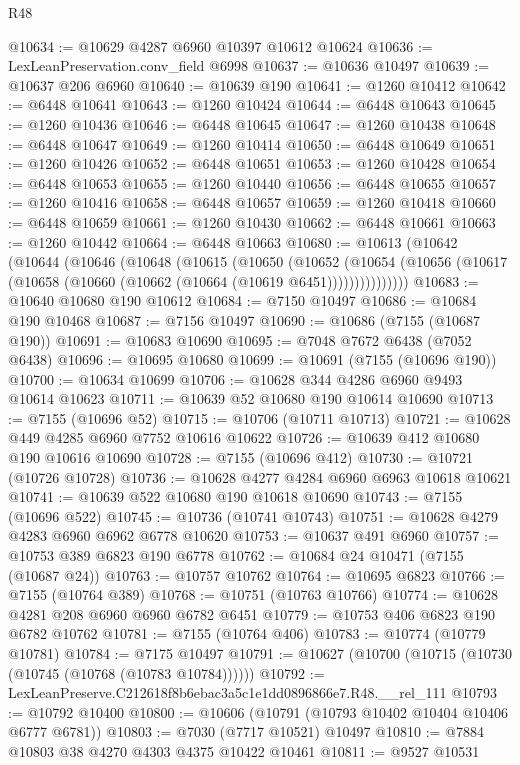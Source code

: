 \begin{lexlean}{R48}
\begin{coremodule}
@10634 := @10629 @4287 @6960 @10397 @10612 @10624
@10636 := LexLeanPreservation.conv_field @6998
@10637 := @10636 @10497
@10639 := @10637 @206 @6960
@10640 := @10639 @190
@10641 := @1260 @10412
@10642 := @6448 @10641
@10643 := @1260 @10424
@10644 := @6448 @10643
@10645 := @1260 @10436
@10646 := @6448 @10645
@10647 := @1260 @10438
@10648 := @6448 @10647
@10649 := @1260 @10414
@10650 := @6448 @10649
@10651 := @1260 @10426
@10652 := @6448 @10651
@10653 := @1260 @10428
@10654 := @6448 @10653
@10655 := @1260 @10440
@10656 := @6448 @10655
@10657 := @1260 @10416
@10658 := @6448 @10657
@10659 := @1260 @10418
@10660 := @6448 @10659
@10661 := @1260 @10430
@10662 := @6448 @10661
@10663 := @1260 @10442
@10664 := @6448 @10663
@10680 := @10613
    (@10642
      (@10644
        (@10646
          (@10648
            (@10615
              (@10650
                (@10652
                  (@10654
                    (@10656 (@10617 (@10658 (@10660 (@10662 (@10664 (@10619 @6451)))))))))))))))
@10683 := @10640 @10680 @190 @10612
@10684 := @7150 @10497
@10686 := @10684 @190 @10468
@10687 := @7156 @10497
@10690 := @10686 (@7155 (@10687 @190))
@10691 := @10683 @10690
@10695 := @7048 @7672 @6438 (@7052 @6438)
@10696 := @10695 @10680
@10699 := @10691 (@7155 (@10696 @190))
@10700 := @10634 @10699
@10706 := @10628 @344 @4286 @6960 @9493 @10614 @10623
@10711 := @10639 @52 @10680 @190 @10614 @10690
@10713 := @7155 (@10696 @52)
@10715 := @10706 (@10711 @10713)
@10721 := @10628 @449 @4285 @6960 @7752 @10616 @10622
@10726 := @10639 @412 @10680 @190 @10616 @10690
@10728 := @7155 (@10696 @412)
@10730 := @10721 (@10726 @10728)
@10736 := @10628 @4277 @4284 @6960 @6963 @10618 @10621
@10741 := @10639 @522 @10680 @190 @10618 @10690
@10743 := @7155 (@10696 @522)
@10745 := @10736 (@10741 @10743)
@10751 := @10628 @4279 @4283 @6960 @6962 @6778 @10620
@10753 := @10637 @491 @6960
@10757 := @10753 @389 @6823 @190 @6778
@10762 := @10684 @24 @10471 (@7155 (@10687 @24))
@10763 := @10757 @10762
@10764 := @10695 @6823
@10766 := @7155 (@10764 @389)
@10768 := @10751 (@10763 @10766)
@10774 := @10628 @4281 @208 @6960 @6960 @6782 @6451
@10779 := @10753 @406 @6823 @190 @6782 @10762
@10781 := @7155 (@10764 @406)
@10783 := @10774 (@10779 @10781)
@10784 := @7175 @10497
@10791 := @10627 (@10700 (@10715 (@10730 (@10745 (@10768 (@10783 @10784))))))
@10792 := LexLeanPreserve.C212618f8b6ebac3a5c1e1dd0896866e7.R48.__rel_111
@10793 := @10792 @10400
@10800 := @10606 (@10791 (@10793 @10402 @10404 @10406 @6777 @6781))
@10803 := @7030 (@7717 @10521) @10497
@10810 := @7884 @10803 @38 @4270 @4303 @4375 @10422 @10461
@10811 := @9527 @10531

\end{coremodule}
\end{lexlean}

